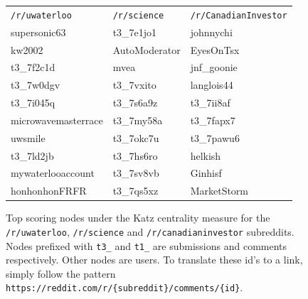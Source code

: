 \documentclass[letterpaper, 10 pt, conference]{ieeeconf}
\theoremstyle{definition}
\begin{document}
\begin{figure}
  \centering
  \begin{tabular}{l|l|l}
    \texttt{/r/uwaterloo}   & \texttt{/r/science} & \texttt{/r/CanadianInvestor} \\ \hhline{=|=|=}
    supersonic63            & t3\_7e1jo1          & johnnychi \\ \hline
    kw2002                  & AutoModerator       & EyesOnTsx\\ \hline
    t3\_7f2c1d              & mvea                & jnf\_goonie\\ \hline
    t3\_7w0dgv              & t3\_7vxito          & langlois44\\ \hline
    t3\_7i045q              & t3\_7s6a9z          & t3\_7ii8af\\ \hline
    microwavemasterrace     & t3\_7my58a          & t3\_7fapx7\\ \hline
    uwsmile                 & t3\_7okc7u          & t3\_7pawu6\\ \hline
    t3\_7ld2jb              & t3\_7hs6ro          & helkish\\ \hline
    mywaterlooaccount       & t3\_7sv8vb          & Ginhisf\\ \hline
    honhonhonFRFR           & t3\_7qs5xz          & MarketStorm
  \end{tabular}
  \caption{Top scoring nodes under the Katz centrality measure for the \texttt{/r/uwaterloo}, \texttt{/r/science} and \texttt{/r/canadianinvestor} subreddits. Nodes prefixed with \texttt{t3\_} and \texttt{t1\_} are submissions and comments respectively. Other nodes are users. To translate these id's to a link, simply follow the pattern \texttt{https://reddit.com/r/\{subreddit\}/comments/\{id\}}.}
  \label{fig:analysis:katz-table}
\end{figure}
\end{document}
